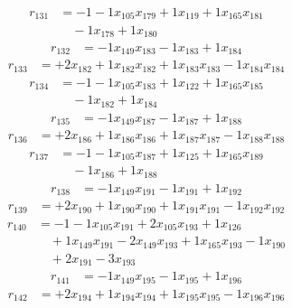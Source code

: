 \[\begin{aligned}
r_{131} &= - 1 - 1 x_{105} x_{179} + 1 x_{119} + 1 x_{165} x_{181} \\
 &\quad - 1 x_{178} + 1 x_{180}
\end{aligned}\]
\[\begin{aligned}
r_{132} &= - 1 x_{149} x_{183} - 1 x_{183} + 1 x_{184}
\end{aligned}\]
\[\begin{aligned}
r_{133} &= + 2 x_{182} + 1 x_{182} x_{182} + 1 x_{183} x_{183} - 1 x_{184} x_{184}
\end{aligned}\]
\[\begin{aligned}
r_{134} &= - 1 - 1 x_{105} x_{183} + 1 x_{122} + 1 x_{165} x_{185} \\
 &\quad - 1 x_{182} + 1 x_{184}
\end{aligned}\]
\[\begin{aligned}
r_{135} &= - 1 x_{149} x_{187} - 1 x_{187} + 1 x_{188}
\end{aligned}\]
\[\begin{aligned}
r_{136} &= + 2 x_{186} + 1 x_{186} x_{186} + 1 x_{187} x_{187} - 1 x_{188} x_{188}
\end{aligned}\]
\[\begin{aligned}
r_{137} &= - 1 - 1 x_{105} x_{187} + 1 x_{125} + 1 x_{165} x_{189} \\
 &\quad - 1 x_{186} + 1 x_{188}
\end{aligned}\]
\[\begin{aligned}
r_{138} &= - 1 x_{149} x_{191} - 1 x_{191} + 1 x_{192}
\end{aligned}\]
\[\begin{aligned}
r_{139} &= + 2 x_{190} + 1 x_{190} x_{190} + 1 x_{191} x_{191} - 1 x_{192} x_{192}
\end{aligned}\]
\[\begin{aligned}
r_{140} &= - 1 - 1 x_{105} x_{191} + 2 x_{105} x_{193} + 1 x_{126} \\
 &\quad + 1 x_{149} x_{191} - 2 x_{149} x_{193} + 1 x_{165} x_{193} - 1 x_{190} \\
 &\quad + 2 x_{191} - 3 x_{193}
\end{aligned}\]
\[\begin{aligned}
r_{141} &= - 1 x_{149} x_{195} - 1 x_{195} + 1 x_{196}
\end{aligned}\]
\[\begin{aligned}
r_{142} &= + 2 x_{194} + 1 x_{194} x_{194} + 1 x_{195} x_{195} - 1 x_{196} x_{196}
\end{aligned}\]
